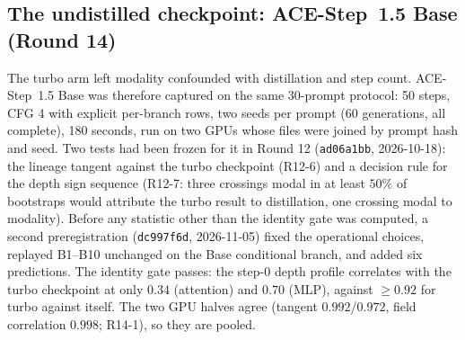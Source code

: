 \documentclass[11pt]{article}
\begin{document}
\subsection{The undistilled checkpoint: ACE-Step~1.5 Base (Round 14)}
The turbo arm left modality confounded with distillation and step count. ACE-Step~1.5 Base was therefore captured on the same 30-prompt protocol: 50 steps, CFG 4 with explicit per-branch rows, two seeds per prompt (60 generations, all complete), 180 seconds, run on two GPUs whose files were joined by prompt hash and seed. Two tests had been frozen for it in Round 12 (\texttt{ad06a1bb}, 2026-10-18): the lineage tangent against the turbo checkpoint (R12-6) and a decision rule for the depth sign sequence (R12-7: three crossings modal in at least $50\%$ of bootstraps would attribute the turbo result to distillation, one crossing modal to modality). Before any statistic other than the identity gate was computed, a second preregistration (\texttt{dc997f6d}, 2026-11-05) fixed the operational choices, replayed B1--B10 unchanged on the Base conditional branch, and added six predictions. The identity gate passes: the step-0 depth profile correlates with the turbo checkpoint at only $0.34$ (attention) and $0.70$ (MLP), against $\ge0.92$ for turbo against itself. The two GPU halves agree (tangent $0.992$/$0.972$, field correlation $0.998$; R14-1), so they are pooled.
\end{document}

